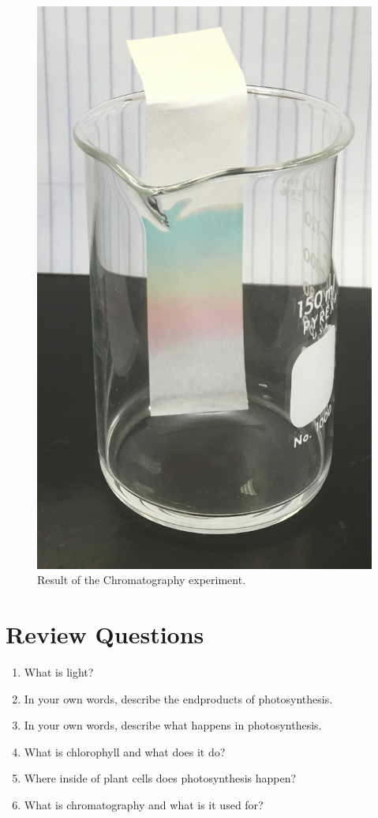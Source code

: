 \begin{figure}

{\centering \includegraphics[width=0.7\linewidth]{./figures/photosynthesis/chromatography}

}

\caption{Result of the Chromatography experiment.}\label{fig:chromatography}
\end{figure}

\section{Review Questions}\label{review-questions-5}

\begin{enumerate}
\def\labelenumi{\arabic{enumi}.}
\tightlist
\item
  What is light?
\item
  In your own words, describe the endproducts of photosynthesis.
\item
  In your own words, describe what happens in photosynthesis.
\item
  What is chlorophyll and what does it do?
\item
  Where inside of plant cells does photosynthesis happen?
\item
  What is chromatography and what is it used for?
\end{enumerate}


